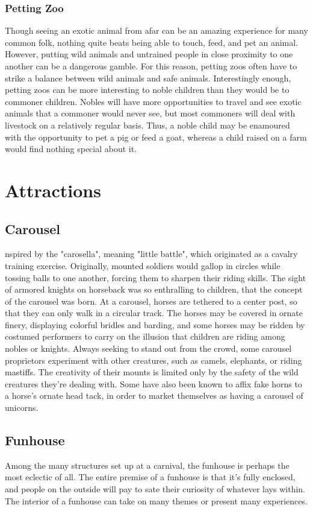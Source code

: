 \documentclass[10pt,a4paper,twoside,bg=print,twocolumn,openany,nodeprecatedcode]{dndbook}
\begin{document}
\subsection{Petting Zoo}
Though seeing an exotic animal from afar can be an amazing experience for many common folk, nothing quite beats being able to touch, feed, and pet an animal. However, putting wild animals and untrained people in close proximity to one another can be a dangerous gamble. For this reason, petting zoos often have to strike a balance between wild animals and safe animals. Interestingly enough, petting zoos can be more interesting to noble children than they would be to commoner children. Nobles will have more opportunities to travel and see exotic animals that a commoner would never see, but most commoners will deal with livestock on a relatively regular basis. Thus, a noble child may be enamoured with the opportunity to pet a pig or feed a goat, whereas a child raised on a farm would find nothing special about it.
\chapter{Attractions}
\section{Carousel}
nspired by the "carosella", meaning "little battle", which originated as a cavalry training exercise. Originally, mounted soldiers would gallop in circles while tossing balls to one another, forcing them to sharpen their riding skills. The sight of armored knights on horseback was so enthralling to children, that the concept of the carousel was born. At a carousel, horses are tethered to a center post, so that they can only walk in a circular track. The horses may be covered in ornate finery, displaying colorful bridles and barding, and some horses may be ridden by costumed performers to carry on the illusion that children are riding among nobles or knights. Always seeking to stand out from the crowd, some carousel proprietors experiment with other creatures, such as camels, elephants, or riding mastiffs. The creativity of their mounts is limited only by the safety of the wild creatures they're dealing with. Some have also been known to affix fake horns to a horse's ornate head tack, in order to market themselves as having a carousel of unicorns. 

\section{Funhouse}
Among the many structures set up at a carnival, the funhouse is perhaps the most eclectic of all. The entire premise of a funhouse is that it's fully enclosed, and people on the outside will pay to sate their curiosity of whatever lays within. The interior of a funhouse can take on many themes or present many experiences.
\end{document}
